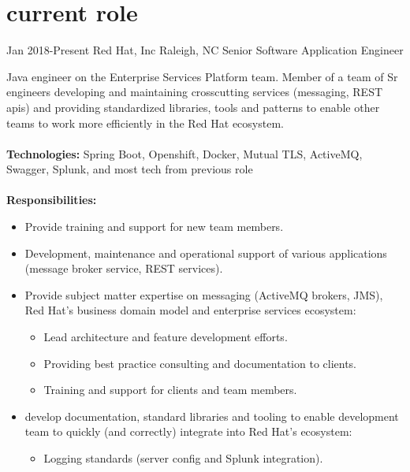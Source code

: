 
\section{current role}

\begin{entrylist}


\workentry
{Jan 2018-Present}
{Red Hat, Inc}
{Raleigh, NC}
{Senior Software Application Engineer}
{Java engineer on the Enterprise Services Platform team. Member of a team of Sr engineers developing and maintaining crosscutting services (messaging, REST apis) and providing standardized libraries, tools and patterns to enable other teams to work more efficiently in the Red Hat ecosystem. \\
\\
\textbf{Technologies:} Spring Boot, Openshift, Docker, Mutual TLS, ActiveMQ, Swagger, Splunk, and most tech from previous role \\
\\
\textbf{Responsibilities:}
\begin{itemize}
\item Provide training and support for new team members.
\item Development, maintenance and operational support of various applications (message broker service, REST services).
\item Provide subject matter expertise on messaging (ActiveMQ brokers, JMS), Red Hat's business domain model and enterprise services ecosystem:
  \begin{itemize}
    \item Lead architecture and feature development efforts.
    \item Providing best practice consulting and documentation to clients.
    \item Training and support for clients and team members.
  \end{itemize}
\item develop documentation, standard libraries and tooling to enable development team to quickly (and correctly) integrate into Red Hat's ecosystem:
  \begin{itemize}
    \item Logging standards (server config and Splunk integration).

\end{itemize}
\end{itemize}}
\end{entrylist}
